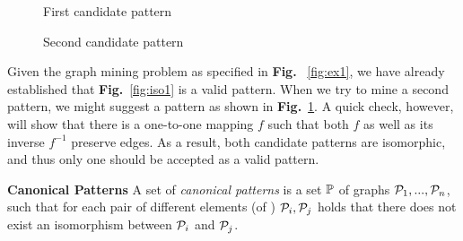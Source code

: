 \vspace{-2em}

\begin{figure}[h]
  \centering
  \begin{minipage}{0.45\textwidth}
    \centering
    \caption{First candidate pattern\label{fig:iso1}}
  \end{minipage}
  \begin{minipage}{0.45\textwidth}
    \centering
    \caption{Second candidate pattern\label{fig:iso2}}
  \end{minipage}
\end{figure}
\vspace{-1em}
Given the graph mining problem as specified in \textbf{Fig.} ~\ref{fig:ex1}, we have already established that \textbf{Fig.}~\ref{fig:iso1} is a valid pattern.
When we try to mine a second pattern, we might suggest a pattern as shown in \textbf{Fig.}~\ref{fig:iso2}.
A quick check, however, will show that there is a one-to-one mapping $f$ such that both $f$ as well as its inverse $f^{-1}$ preserve edges.
As a result, both candidate patterns are isomorphic, and thus only one should be accepted as a valid pattern.

\begin{definition} \textbf{Canonical Patterns}
A set of \emph{canonical patterns} is a set $\mathbb{P}$ of graphs $\mathcal{P}_{1},...,\mathcal{P}_{n}$, such that for each pair of different elements (of ) $\mathcal{P}_{i}, \mathcal{P}_{j}$ holds that there does not exist an isomorphism between $\mathcal{P}_{i}$ and $\mathcal{P}_{j}$.
\end{definition}

